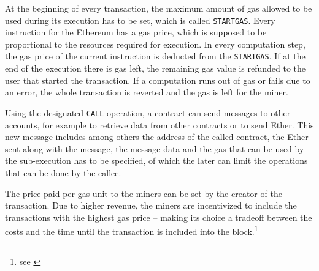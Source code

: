 At the beginning of every transaction, the maximum amount of gas allowed to be used during its execution has to be set, which is called \texttt{STARTGAS}. Every instruction for the Ethereum has a gas price, which is supposed to be proportional to the resources required for execution. In every computation step, the gas price of the current instruction is deducted from the \texttt{STARTGAS}. If at the end of the execution there is gas left, the remaining gas value is refunded to the user that started the transaction. If a computation runs out of gas or fails due to an error, the whole transaction is reverted and the gas is left for the miner.

Using the designated \texttt{CALL} operation, a contract can send messages to other accounts, for example to retrieve data from other contracts or to send Ether. This new message includes among others the address of the called contract, the Ether sent along with the message, the message data and the gas that can be used by the sub-execution has to be specified, of which the later can limit the operations that can be done by the callee.

The price paid per gas unit to the miners can be set by the creator of the transaction. Due to higher revenue, the miners are incentivized to include the transactions with the highest gas price -- making its choice a tradeoff between the costs and the time until the transaction is included into the block.\footnote{see \cite[Whitepaper]{ethereum:wiki}}
